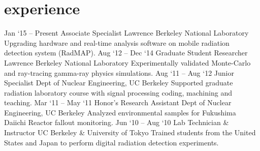 \documentclass{resume} %
\begin{document}
\section{experience}
\begin{entrylist}
	\entry
		{Jan `15 -- Present}
		{Associate Specialist}
		{Lawrence Berkeley National Laboratory}
		{
		Upgrading hardware and real-time analysis software on mobile radiation detection system (RadMAP).
		}
	\entry
		{Aug `12 -- Dec `14}
		{Graduate Student Researcher}
		{Lawrence Berkeley National Laboratory}
		{
		Experimentally validated Monte-Carlo and ray-tracing gamma-ray physics simulations.
		}
	\entry
		{Aug `11 -- Aug `12}
		{Junior Specialist}
		{Dept of Nuclear Engineering, UC Berkeley}
		{
		Supported graduate radiation laboratory course with signal processing coding, machining and teaching.%
		}
	\entry
		{Mar `11 -- May `11}
		{Honor's Research Assistant}
		{Dept of Nuclear Engineering, UC Berkeley}
		{
		Analyzed environmental samples for Fukushima Daiichi Reactor fallout monitoring.%
		}
	\entry
		{Jun `10 -- Aug `10}
		{Lab Technician \& Instructor}
		{UC Berkeley \& University of Tokyo}
		{
		Trained students from the United States and Japan to perform digital radiation detection experiments.%
		}

\end{entrylist}
\end{document}
